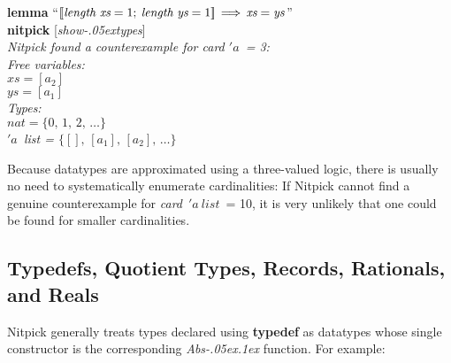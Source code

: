 \documentclass[a4paper,12pt]{article}
\def\unr{\ldots}
\renewcommand\_{\hbox{\textunderscore\kern-.05ex}}
\begin{document}
\prew
\textbf{lemma} ``$\mathopen{[\![} \textit{length}~\textit{xs} = 1;\> \textit{length}~\textit{ys} = 1
\mathclose{]\!]} \,\Longrightarrow\, \textit{xs} = \textit{ys\/}$''
\\
\textbf{nitpick} [\textit{show\_types}] \\[2\smallskipamount]
\slshape Nitpick found a counterexample for \textit{card} $'a$~= 3: \\[2\smallskipamount]
\hbox{}\qquad Free variables: \nopagebreak \\
\hbox{}\qquad\qquad $\textit{xs} = [a_2]$ \\
\hbox{}\qquad\qquad $\textit{ys} = [a_1]$ \\
\hbox{}\qquad Types: \\
\hbox{}\qquad\qquad $\textit{nat} = \{0,\, 1,\, 2,\, \unr\}$ \\
\hbox{}\qquad\qquad $'a$~\textit{list} = $\{[],\, [a_1],\, [a_2],\, \unr\}$
\postw

Because datatypes are approximated using a three-valued logic, there is usually
no need to systematically enumerate cardinalities: If Nitpick cannot find a
genuine counterexample for \textit{card}~$'a~\textit{list}$~= 10, it is very
unlikely that one could be found for smaller cardinalities.

\subsection{Typedefs, Quotient Types, Records, Rationals, and Reals}
\label{typedefs-quotient-types-records-rationals-and-reals}

Nitpick generally treats types declared using \textbf{typedef} as datatypes
whose single constructor is the corresponding \textit{Abs\_\kern.1ex} function.
For example:
\end{document}
